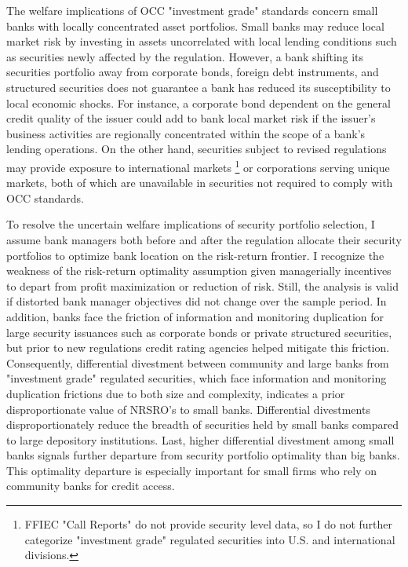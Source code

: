 \documentclass[preprint,12pt]{elsarticle}
\begin{document}
The welfare implications of OCC "investment grade" standards concern small banks with locally concentrated asset portfolios.  Small banks may reduce local market risk by investing in assets uncorrelated with local lending conditions such as securities newly affected by the regulation.  However, a bank shifting its securities portfolio away from corporate bonds, foreign debt instruments, and structured securities does not guarantee a bank has reduced its susceptibility to local economic shocks.  For instance, a corporate bond dependent on the general credit quality of the issuer could add to bank local market risk if the issuer's business activities are regionally concentrated within the scope of a bank's lending operations.  On the other hand, securities subject to revised regulations may provide exposure to international markets \footnote{FFIEC "Call Reports" do not provide security level data, so I do not further categorize "investment grade" regulated securities into U.S. and international divisions.} or corporations serving unique markets, both of which are unavailable in securities not required to comply with OCC standards. 

To resolve the uncertain welfare implications of security portfolio selection, I assume bank managers both before and after the regulation allocate their security portfolios to optimize bank location on the risk-return frontier.  I recognize the weakness of the risk-return optimality assumption given managerially incentives to depart from profit maximization or reduction of risk.  Still, the analysis is valid if distorted bank manager objectives did not change over the sample period.  In addition, banks face the friction of information and monitoring duplication for large security issuances such as corporate bonds or private structured securities, but prior to new regulations credit rating agencies helped mitigate this friction.  Consequently, differential divestment between community and large banks from "investment grade" regulated securities, which face information and monitoring duplication frictions due to both size and complexity, indicates a prior disproportionate value of NRSRO's to small banks.  Differential divestments disproportionately reduce the breadth of securities held by small banks compared to large depository institutions.  Last, higher differential divestment among small banks signals further departure from security portfolio optimality than big banks.  This optimality departure is especially important for small firms who rely on community banks for credit access.  
\end{document}
